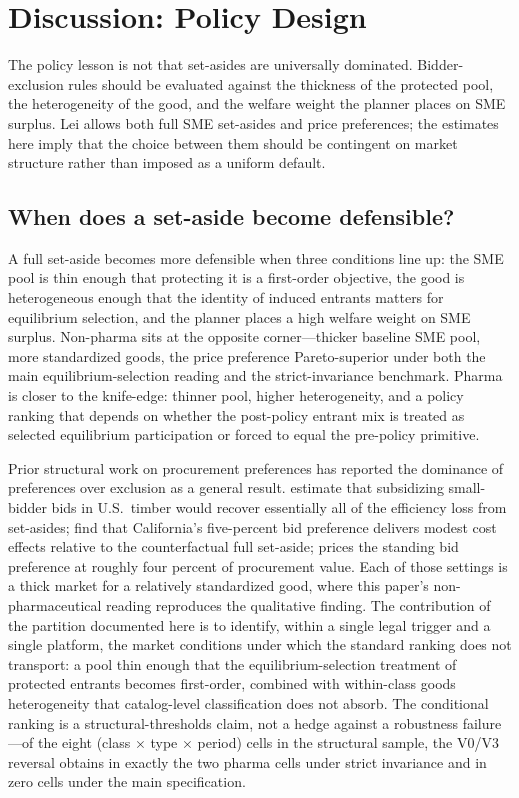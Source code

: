 \section{Discussion: Policy Design}\label{sec:discussion}

The policy lesson is not that set-asides are universally dominated. Bidder-exclusion rules should be evaluated against the thickness of the protected pool, the heterogeneity of the good, and the welfare weight the planner places on SME surplus. Lei \leiNova{} allows both full SME set-asides and price preferences; the estimates here imply that the choice between them should be contingent on market structure rather than imposed as a uniform default.

\subsection{When does a set-aside become defensible?}

A full set-aside becomes more defensible when three conditions line up: the SME pool is thin enough that protecting it is a first-order objective, the good is heterogeneous enough that the identity of induced entrants matters for equilibrium selection, and the planner places a high welfare weight on SME surplus. Non-pharma sits at the opposite corner---thicker baseline SME pool, more standardized goods, the \optPrefThreshold{} price preference Pareto-superior under both the main equilibrium-selection reading and the strict-invariance benchmark. Pharma is closer to the knife-edge: thinner pool, higher heterogeneity, and a policy ranking that depends on whether the post-policy entrant mix is treated as selected equilibrium participation or forced to equal the pre-policy primitive.

Prior structural work on procurement preferences has reported the dominance of preferences over exclusion as a general result. \citet{athey2013} estimate that subsidizing small-bidder bids in U.S.\ timber would recover essentially all of the efficiency loss from set-asides; \citet{krasnokutskayaseim2011} find that California's five-percent bid preference delivers modest cost effects relative to the counterfactual full set-aside; \citet{marion2007} prices the standing bid preference at roughly four percent of procurement value. Each of those settings is a thick market for a relatively standardized good, where this paper's non-pharmaceutical reading reproduces the qualitative finding. The contribution of the partition documented here is to identify, within a single legal trigger and a single platform, the market conditions under which the standard ranking does not transport: a pool thin enough that the equilibrium-selection treatment of protected entrants becomes first-order, combined with within-class goods heterogeneity that catalog-level classification does not absorb. The conditional ranking is a structural-thresholds claim, not a hedge against a robustness failure---of the eight (class $\times$ type $\times$ period) cells in the structural sample, the V0/V3 reversal obtains in exactly the two pharma cells under strict invariance and in zero cells under the main specification.

